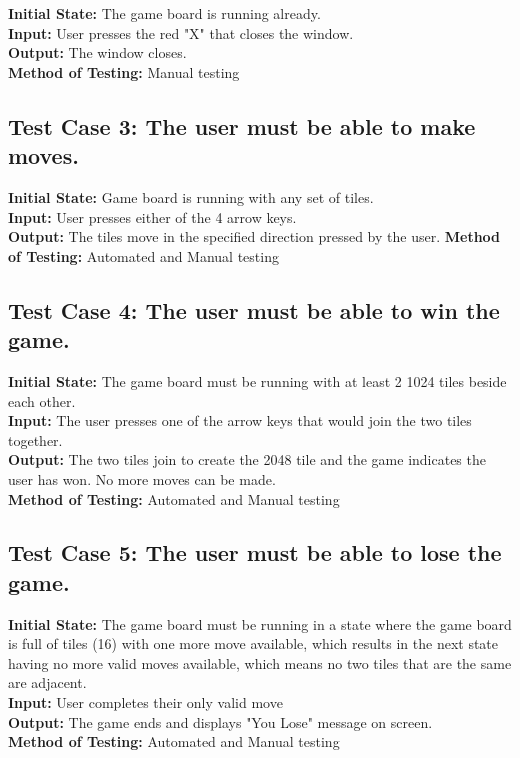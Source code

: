 \documentclass[12pt]{article}
\begin{document}
\textbf{Initial State:} The game board is running already.\\
\textbf{Input:} User presses the red "X" that closes the window.\\
\textbf{Output:} The window closes. \\
\textbf{Method of Testing:} Manual testing

\subsection{Test Case 3: The user must be able to make moves.}

\textbf{Initial State:} Game board is running with any set of tiles.\\
\textbf{Input:} User presses either of the 4 arrow keys.\\
\textbf{Output:} The tiles move in the specified direction pressed by the user.
\textbf{Method of Testing:} Automated and Manual testing

\subsection{Test Case 4: The user must be able to win the game.}

\textbf{Initial State:} The game board must be running with at least 2 1024 tiles beside each other.\\
\textbf{Input:} The user presses one of the arrow keys that would join the two tiles together.\\
\textbf{Output:} The two tiles join to create the 2048 tile and the game indicates the user has won. No more moves can be made.\\
\textbf{Method of Testing:} Automated and Manual testing

\subsection{Test Case 5: The user must be able to lose the game.}

\textbf{Initial State:} The game board must be running in a state where the game board is full of tiles (16) with one more move available, which results in the next state having no more valid moves available, which means no two tiles that are the same are adjacent.\\
\textbf{Input:} User completes their only valid move\\
\textbf{Output:} The game ends and displays "You Lose" message on screen.\\
\textbf{Method of Testing:} Automated and Manual testing
\end{document}

